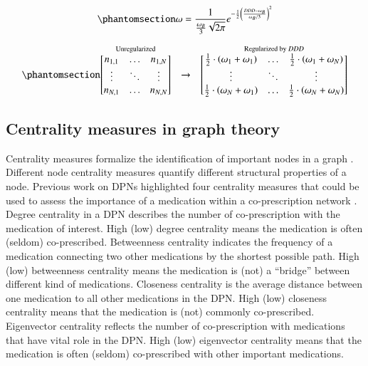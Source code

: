 \documentclass[
  authoryear,
  review]{elsarticle}
\begin{document}
\begin{equation}\phantomsection\label{eq-weighted-DDD}{\omega = \frac{1}{\frac{\omega_B}{3} \sqrt{2 \pi}} e^{-\frac{1}{2}\left(\frac{DDD - \omega_B}{\omega_B/3}\right)^2}}\end{equation}

\begin{equation}\phantomsection\label{eq-regularize-mtx}{
\stackrel{\textrm{Unregularized}}{
  \begin{bmatrix}
  n_{1, 1} & \dots & n_{1, N} \\
  \vdots & \ddots & \vdots \\
  n_{N, 1} & \dots & n_{N, N} \\
  \end{bmatrix}
}
\quad \to \quad
\stackrel{\textrm{Regularized by } DDD}{
  \begin{bmatrix}
  \frac{1}{2} \cdot \left(\omega_1 + \omega_1 \right) & \dots & \frac{1}{2} \cdot \left(\omega_1 + \omega_N \right) \\
  \vdots & \ddots & \vdots \\
  \frac{1}{2} \cdot \left(\omega_N + \omega_1 \right) & \dots & \frac{1}{2} \cdot \left(\omega_N + \omega_N \right) \\
  \end{bmatrix}
}
}\end{equation}

\subsection{Centrality measures in graph
theory}\label{centrality-measures-in-graph-theory}

Centrality measures formalize the identification of important nodes in a
graph \citep{estrada2012structure}. Different node centrality measures
quantify different structural properties of a node. Previous work on
DPNs highlighted four centrality measures that could be used to assess
the importance of a medication within a co-prescription network
\citep{Miglio2021}. Degree centrality in a DPN describes the number of
co-prescription with the medication of interest. High (low) degree
centrality means the medication is often (seldom) co-prescribed.
Betweenness centrality indicates the frequency of a medication
connecting two other medications by the shortest possible path. High
(low) betweenness centrality means the medication is (not) a ``bridge''
between different kind of medications. Closeness centrality is the
average distance between one medication to all other medications in the
DPN. High (low) closeness centrality means that the medication is (not)
commonly co-prescribed. Eigenvector centrality reflects the number of
co-prescription with medications that have vital role in the DPN. High
(low) eigenvector centrality means that the medication is often (seldom)
co-prescribed with other important medications.
\end{document}
